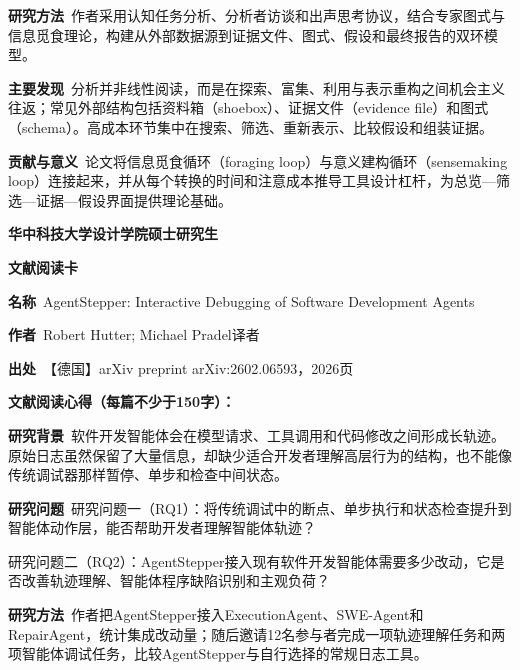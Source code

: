 \noindent\textbf{研究方法}\ 作者采用认知任务分析、分析者访谈和出声思考协议，结合专家图式与信息觅食理论，构建从外部数据源到证据文件、图式、假设和最终报告的双环模型。\par
\noindent\textbf{主要发现}\ 分析并非线性阅读，而是在探索、富集、利用与表示重构之间机会主义往返；常见外部结构包括资料箱（shoebox）、证据文件（evidence file）和图式（schema）。高成本环节集中在搜索、筛选、重新表示、比较假设和组装证据。\par
\noindent\textbf{贡献与意义}\ 论文将信息觅食循环（foraging loop）与意义建构循环（sensemaking loop）连接起来，并从每个转换的时间和注意成本推导工具设计杠杆，为总览—筛选—证据—假设界面提供理论基础。\par
\clearpage
\begin{center}
{\songti\bfseries\fontsize{18.5pt}{27.75pt}\selectfont 华中科技大学设计学院硕士研究生\par}
{\songti\bfseries\fontsize{18.5pt}{27.75pt}\selectfont 文献阅读卡\par}
\end{center}
\vspace{0.25em}
\noindent\underline{}\par
\vspace{0.35em}
\noindent\textbf{名称}\ AgentStepper: Interactive Debugging of Software Development Agents\par
\noindent\textbf{作者}\ Robert Hutter; Michael Pradel\quad 译者\par
\noindent\textbf{出处}\ 【德国】arXiv preprint arXiv:2602.06593，2026\quad 页\par
\vspace{0.35em}
\noindent\textbf{文献阅读心得（每篇不少于150字）：}\par
\noindent\textbf{研究背景}\ 软件开发智能体会在模型请求、工具调用和代码修改之间形成长轨迹。原始日志虽然保留了大量信息，却缺少适合开发者理解高层行为的结构，也不能像传统调试器那样暂停、单步和检查中间状态。\par
\noindent\textbf{研究问题}\ 研究问题一（RQ1）：将传统调试中的断点、单步执行和状态检查提升到智能体动作层，能否帮助开发者理解智能体轨迹？\par
研究问题二（RQ2）：AgentStepper接入现有软件开发智能体需要多少改动，它是否改善轨迹理解、智能体程序缺陷识别和主观负荷？\par
\noindent\textbf{研究方法}\ 作者把AgentStepper接入ExecutionAgent、SWE-Agent和RepairAgent，统计集成改动量；随后邀请12名参与者完成一项轨迹理解任务和两项智能体调试任务，比较AgentStepper与自行选择的常规日志工具。\par
